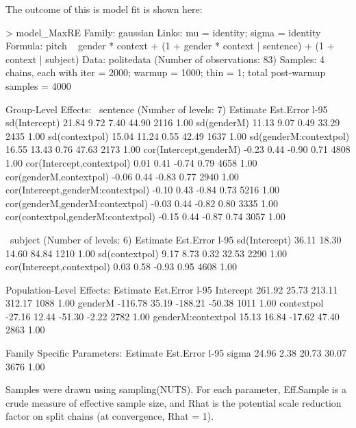 \documentclass[nobib]{tufte-handout}
\begin{document}
The outcome of this is model fit is shown here:

\medskip

\begin{minipage}[]{1.5\textwidth}
\begin{rc}
> model_MaxRE
 Family: gaussian 
  Links: mu = identity; sigma = identity 
Formula: pitch ~ gender * context + (1 + gender * context | sentence) + (1 + context | subject) 
   Data: politedata (Number of observations: 83) 
Samples: 4 chains, each with iter = 2000; warmup = 1000; thin = 1;
         total post-warmup samples = 4000

Group-Level Effects: 
~sentence (Number of levels: 7) 
                                   Estimate Est.Error l-95%
sd(Intercept)                         21.84      9.72     7.40    44.90       2116 1.00
sd(genderM)                           11.13      9.07     0.49    33.29       2435 1.00
sd(contextpol)                        15.04     11.24     0.55    42.49       1637 1.00
sd(genderM:contextpol)                16.55     13.43     0.76    47.63       2173 1.00
cor(Intercept,genderM)                -0.23      0.44    -0.90     0.71       4808 1.00
cor(Intercept,contextpol)              0.01      0.41    -0.74     0.79       4658 1.00
cor(genderM,contextpol)               -0.06      0.44    -0.83     0.77       2940 1.00
cor(Intercept,genderM:contextpol)     -0.10      0.43    -0.84     0.73       5216 1.00
cor(genderM,genderM:contextpol)       -0.03      0.44    -0.82     0.80       3335 1.00
cor(contextpol,genderM:contextpol)    -0.15      0.44    -0.87     0.74       3057 1.00

~subject (Number of levels: 6) 
                          Estimate Est.Error l-95%
sd(Intercept)                36.11     18.30    14.60    84.84       1210 1.00
sd(contextpol)                9.17      8.73     0.32    32.53       2290 1.00
cor(Intercept,contextpol)     0.03      0.58    -0.93     0.95       4608 1.00

Population-Level Effects: 
                   Estimate Est.Error l-95%
Intercept            261.92     25.73   213.11   312.17       1088 1.00
genderM             -116.78     35.19  -188.21   -50.38       1011 1.00
contextpol           -27.16     12.44   -51.30    -2.22       2782 1.00
genderM:contextpol    15.13     16.84   -17.62    47.40       2863 1.00

Family Specific Parameters: 
      Estimate Est.Error l-95%
sigma    24.96      2.38    20.73    30.07       3676 1.00

Samples were drawn using sampling(NUTS). For each parameter, Eff.Sample 
is a crude measure of effective sample size, and Rhat is the potential 
scale reduction factor on split chains (at convergence, Rhat = 1).
\end{rc}
\end{minipage}
\end{document}

